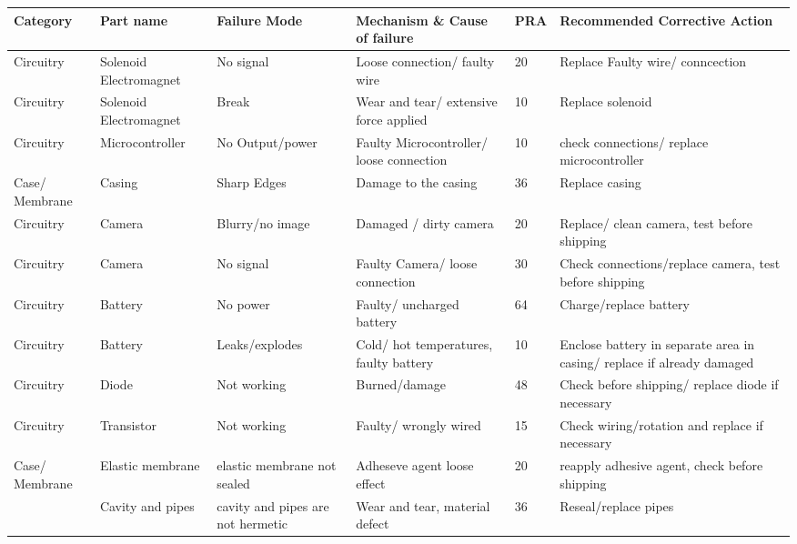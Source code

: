     \begin{table}[!ht] 
        \centering
        \begin{tabular}{b{1.7cm} b{2cm} b{2.5cm} b{4cm}l b{6cm}} 
            \textbf{Category} & \textbf{Part name} & \textbf{Failure Mode} & \textbf{Mechanism \& Cause of failure} & \textbf{PRA} & \textbf{Recommended Corrective Action} \\ \hline
            Circuitry & Solenoid Electromagnet & No signal & Loose connection/ faulty wire & 20 & Replace Faulty wire/ conncection \\ 
            Circuitry & Solenoid Electromagnet & Break  & Wear and tear/ extensive force applied & 10 & Replace solenoid \\ 
            Circuitry & Microcontroller & No Output/power & Faulty Microcontroller/ loose connection & 10 & check connections/ replace microcontroller \\ 
            Case/ Membrane & Casing & Sharp Edges & Damage to the casing  & 36 & Replace casing \\ 
            Circuitry & Camera & Blurry/no image & Damaged / dirty camera & 20 & Replace/ clean camera, test before shipping \\ 
            Circuitry & Camera  & No signal & Faulty Camera/ loose connection & 30 & Check connections/replace camera, test before shipping \\ 
            Circuitry & Battery & No power & Faulty/ uncharged battery & 64 & Charge/replace battery \\ 
            Circuitry & Battery & Leaks/explodes & Cold/ hot temperatures, faulty battery & 10 & Enclose battery in separate area in casing/ replace if already damaged \\ 
            Circuitry & Diode & Not working & Burned/damage & 48 & Check before shipping/ replace diode if necessary \\ 
            Circuitry & Transistor  & Not working & Faulty/ wrongly wired & 15 & Check wiring/rotation and replace if necessary \\ 
            Case/ Membrane & Elastic membrane & elastic membrane not sealed & Adheseve agent loose effect & 20 & reapply adhesive agent, check before shipping \\ 
            ~ & Cavity and pipes & cavity and pipes are not hermetic & Wear and tear, material defect & 36 & Reseal/replace pipes \\ 

\end{tabular}
\end{table}
